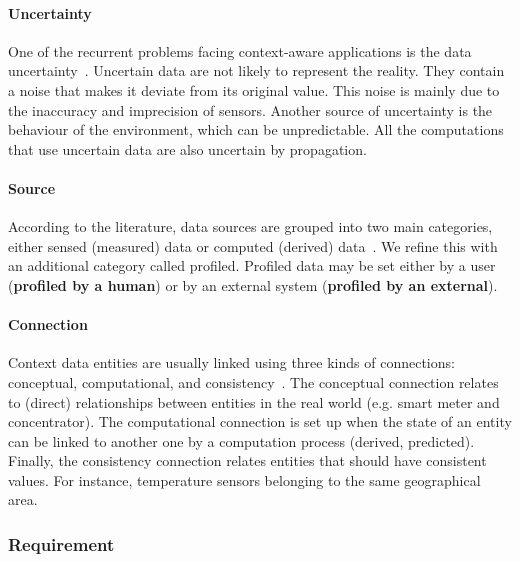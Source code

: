 \paragraph{Uncertainty}
One of the recurrent problems facing context-aware applications is the data uncertainty~\cite{DBLP:conf/dagstuhl/LemosGMSALSTVVWBBBBCDDEGGGGIKKLMMMMMNPPSSSSTWW10, DBLP:conf/pervasive/HenricksenIR02, DBLP:journals/comsur/MakrisSS13, DBLP:journals/percom/BettiniBHINRR10}.
Uncertain data are not likely to represent the reality. They contain a noise that makes it deviate from its original value.
This noise is mainly due to the inaccuracy and imprecision of sensors.
Another source of uncertainty is the behaviour of the environment, which can be unpredictable.
All the computations that use uncertain data are also uncertain by propagation.

\paragraph{Source}
According to the literature, data sources are grouped into two main categories, either sensed (measured) data or computed (derived) \linebreak data~\cite{DBLP:journals/comsur/PereraZCG14}.
We refine this with an additional category called profiled.
Profiled data may be set either by a user (\textbf{profiled by a human}) or by an external system (\textbf{profiled by an external}).

\paragraph{Connection}
Context data entities are usually linked using three kinds of connections: conceptual, computational, and consistency~\cite{DBLP:conf/pervasive/HenricksenIR02, DBLP:journals/percom/BettiniBHINRR10}.
The conceptual connection relates to  (direct) relationships between entities in the real world (e.g. smart meter and concentrator).
The computational connection is set up when the state of an entity can be linked to another one by a computation process (derived, predicted). 
Finally, the consistency connection relates entities that should have consistent values. For instance, temperature sensors belonging to the same geographical area.

\subsubsection{Requirement}
\label{sec:adaptation-req}

